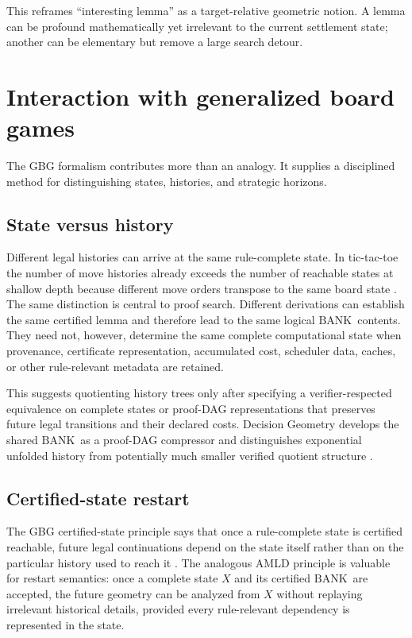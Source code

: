 \documentclass[11pt]{article}
\theoremstyle{remark}
\newcommand{\BANK}{\ensuremath{\mathrm{BANK}}}
\begin{document}
This reframes ``interesting lemma'' as a target-relative geometric notion. A lemma can be profound mathematically yet irrelevant to the current settlement state; another can be elementary but remove a large search detour.

\section{Interaction with generalized board games}

The GBG formalism contributes more than an analogy. It supplies a disciplined method for distinguishing states, histories, and strategic horizons.

\subsection{State versus history}

Different legal histories can arrive at the same rule-complete state. In tic-tac-toe the number of move histories already exceeds the number of reachable states at shallow depth because different move orders transpose to the same board state \cite{TennesonGBG}. The same distinction is central to proof search. Different derivations can establish the same certified lemma and therefore lead to the same logical \BANK\ contents. They need not, however, determine the same complete computational state when provenance, certificate representation, accumulated cost, scheduler data, caches, or other rule-relevant metadata are retained.

This suggests quotienting history trees only after specifying a verifier-respected equivalence on complete states or proof-DAG representations that preserves future legal transitions and their declared costs. Decision Geometry develops the shared \BANK\ as a proof-DAG compressor and distinguishes exponential unfolded history from potentially much smaller verified quotient structure \cite{TennesonAMLDII}.

\subsection{Certified-state restart}

The GBG certified-state principle says that once a rule-complete state is certified reachable, future legal continuations depend on the state itself rather than on the particular history used to reach it \cite{TennesonGBG}. The analogous AMLD principle is valuable for restart semantics: once a complete state $X$ and its certified \BANK\ are accepted, the future geometry can be analyzed from $X$ without replaying irrelevant historical details, provided every rule-relevant dependency is represented in the state.
\end{document}
